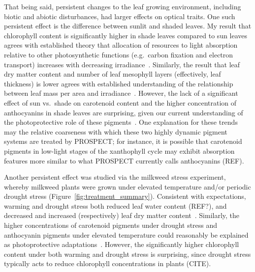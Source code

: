That being said, persistent changes to the leaf growing environment, including biotic and abiotic disturbances, had larger effects on optical traits.
% 
% 
One such persistent effect is the difference between sunlit and shaded leaves.
My result that chlorophyll content is significantly higher in shade leaves compared to sun leaves agrees with established theory that allocation of resources to light absorption relative to other photosynthetic functions (e.g.\ carbon fixation and electron transport) increases with decreasing irradiance~\cite{hikosaka_1995_model}.
Similarly, the result that leaf dry matter content and number of leaf mesophyll layers (effectively, leaf thickness) is lower agrees with established understanding of the relationship between leaf mass per area and irradiance~\cite{poorter_2009_causes}.
However, the lack of a significant effect of sun vs.\ shade on carotenoid content and the higher concentration of anthocyanins in shade leaves are surprising, given our current understanding of the photoprotective role of these pigments~\cite{young_1991_photoprotective,steyn_2002_anthocyanins}.
One explanation for these trends may the relative coarseness with which these two highly dynamic pigment systems are treated by PROSPECT\@;
for instance, it is possible that carotenoid pigments in low-light stages of the xanthophyll cycle may exhibit absorption features more similar to what PROSPECT currently calls anthocyanins (REF). %

Another persistent effect was studied via the milkweed stress experiment, whereby milkweed plants were grown under elevated temperature and/or periodic drought stress (Figure~\ref{fig:treatment_summary}).
Consistent with expectations, warming and drought stress both reduced leaf water content (REF?), and decreased and increased (respectively) leaf dry matter content~\cite{poorter_2009_causes}.
Similarly, the higher concentrations of carotenoid pigments under drought stress and anthocyanin pigments under elevated temperature could reasonably be explained as photoprotective adaptations~\cite{young_1991_photoprotective,steyn_2002_anthocyanins}.
However, the significantly higher chlorophyll content under both warming and drought stress is surprising, since drought stress typically acts to reduce chlorophyll concentrations in plants (CITE).

